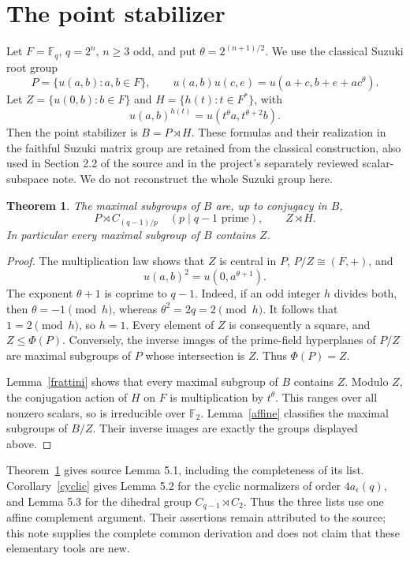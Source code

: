 \documentclass[11pt,a4paper]{article}
\newtheorem{theorem}{Theorem}
\newcommand{\F}{\mathbb F}
\begin{document}
\section{The point stabilizer}
Let $F=\F_q$, $q=2^n$, $n\ge3$ odd, and put
$\theta=2^{(n+1)/2}$. We use the classical Suzuki root group
\[
 P=\{u(a,b):a,b\in F\},\qquad
 u(a,b)u(c,e)=u(a+c,b+e+ac^\theta).
\]
Let $Z=\{u(0,b):b\in F\}$ and $H=\{h(t):t\in F^*\}$, with
\[
 u(a,b)^{h(t)}=u(t^\theta a,t^{\theta+2}b).
\]
Then the point stabilizer is $B=P\rtimes H$. These formulas and
their realization in the faithful Suzuki matrix group are retained
from the classical construction, also used in Section 2.2 of the
source and in the project's separately reviewed scalar-subspace
note. We do not reconstruct the whole Suzuki group here.

\begin{theorem}\label{borel}
The maximal subgroups of $B$ are, up to conjugacy in $B$,
\[
 P\rtimes C_{(q-1)/p}\quad(p\mid q-1\text{ prime}),
 \qquad Z\rtimes H.
\]
In particular every maximal subgroup of $B$ contains $Z$.
\end{theorem}
\begin{proof}
The multiplication law shows that $Z$ is central in $P$,
$P/Z\cong(F,+)$, and
\[
                       u(a,b)^2=u(0,a^{\theta+1}).
\]
The exponent $\theta+1$ is coprime to $q-1$. Indeed, if an odd
integer $h$ divides both, then $\theta=-1\pmod h$, whereas
$\theta^2=2q=2\pmod h$. It follows that $1=2\pmod h$, so $h=1$.
Every element of $Z$ is consequently a square, and $Z\le\Phi(P)$.
Conversely, the inverse images of the prime-field hyperplanes of
$P/Z$ are maximal subgroups of $P$ whose intersection is $Z$.
Thus $\Phi(P)=Z$.

Lemma~\ref{frattini} shows that every maximal subgroup of $B$
contains $Z$. Modulo $Z$, the conjugation action of $H$ on $F$
is multiplication by $t^\theta$. This ranges over all nonzero
scalars, so is irreducible over $\F_2$. Lemma~\ref{affine}
classifies the maximal subgroups of $B/Z$. Their inverse images
are exactly the groups displayed above.
\end{proof}

Theorem~\ref{borel} gives source Lemma 5.1, including the
completeness of its list. Corollary~\ref{cyclic} gives Lemma 5.2
for the cyclic normalizers of order $4a_\epsilon(q)$, and Lemma
5.3 for the dihedral group $C_{q-1}\rtimes C_2$. Thus the three
lists use one affine complement argument. Their assertions remain
attributed to the source; this note supplies the complete common
derivation and does not claim that these elementary tools are new.
\end{document}
